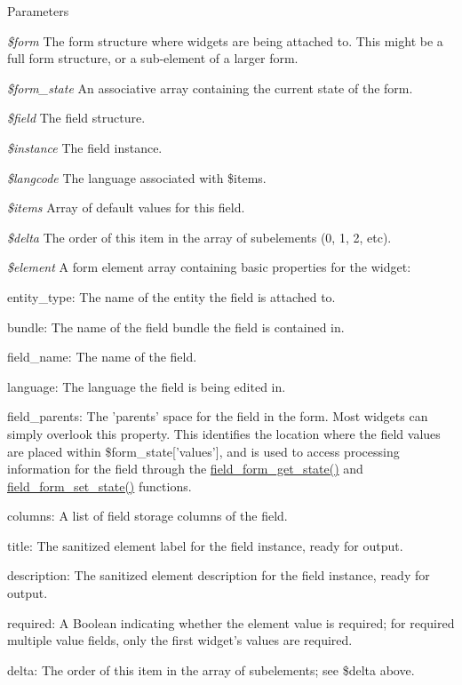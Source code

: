 \begin{DoxyParams}{Parameters}
\item[{\em \$form}]The form structure where widgets are being attached to. This might be a full form structure, or a sub-\/element of a larger form. \item[{\em \$form\_\-state}]An associative array containing the current state of the form. \item[{\em \$field}]The field structure. \item[{\em \$instance}]The field instance. \item[{\em \$langcode}]The language associated with \$items. \item[{\em \$items}]Array of default values for this field. \item[{\em \$delta}]The order of this item in the array of subelements (0, 1, 2, etc). \item[{\em \$element}]A form element array containing basic properties for the widget:
\begin{DoxyItemize}
\item entity\_\-type: The name of the entity the field is attached to.
\item bundle: The name of the field bundle the field is contained in.
\item field\_\-name: The name of the field.
\item language: The language the field is being edited in.
\item field\_\-parents: The 'parents' space for the field in the form. Most widgets can simply overlook this property. This identifies the location where the field values are placed within \$form\_\-state\mbox{[}'values'\mbox{]}, and is used to access processing information for the field through the \hyperlink{field_8form_8inc_a84146d3d086bfc6b242f01c23e552435}{field\_\-form\_\-get\_\-state()} and \hyperlink{field_8form_8inc_a8e21a8b058d1a84d91d1a326242e303e}{field\_\-form\_\-set\_\-state()} functions.
\item columns: A list of field storage columns of the field.
\item title: The sanitized element label for the field instance, ready for output.
\item description: The sanitized element description for the field instance, ready for output.
\item required: A Boolean indicating whether the element value is required; for required multiple value fields, only the first widget's values are required.
\item delta: The order of this item in the array of subelements; see \$delta above.
\end{DoxyItemize}\end{DoxyParams}
